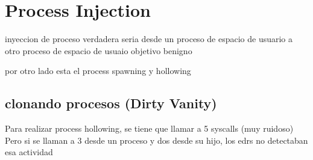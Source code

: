 \chapter{Process Injection}

inyeccion de proceso verdadera seria desde un proceso de espacio de usuario
a otro proceso de espacio de usuaio objetivo benigno

por otro lado esta el process spawning y hollowing

\section{clonando procesos (Dirty Vanity)}

Para realizar process hollowing, se tiene que llamar a 5 syscalls (muy ruidoso)
Pero si se llaman a 3 desde un proceso y dos desde su hijo, los edrs no
detectaban esa actividad